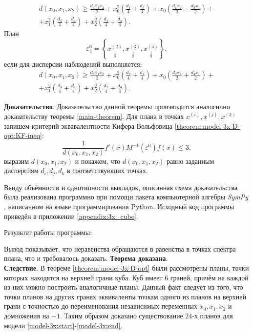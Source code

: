\begin{theorem}
	\begin{multline}\label{theorem:model-3x-D-opt:plan-3-d}
	d(x_0, x_1, x_2) \ge \frac{d_{4} x_{1} x_{2}}{2} + x_{0}^{2} \left(\frac{d_{1}}{4} + \frac{d_{3}}{4}\right) + x_{0} \left(\frac{d_{1} x_{2}}{2} - \frac{d_{3} x_{1}}{2}\right) + \\ + x_{1}^{2} \left(\frac{d_{3}}{4} + \frac{d_{4}}{4}\right) + x_{2}^{2} \left(\frac{d_{1}}{4} + \frac{d_{4}}{4}\right).
	\end{multline}
	План 
	\begin{equation} \label{theorem:model-3x-D-opt:plan-4}
	\varepsilon_4^{0} = \left \{ 
	\underset{\frac 1 3} {x^{(2)}},
	\underset{\frac 1 3} {x^{(3)}},
	\underset{\frac 1 3} {x^{(4)}}
	\right \},
	\end{equation}
	если для дисперсии наблюдений выполняется:
	\begin{multline}\label{theorem:model-3x-D-opt:plan-4-d}
	d(x_0, x_1, x_2) \ge \frac{d_{3} x_{1} x_{2}}{2} + x_{0}^{2} \left(\frac{d_{2}}{4} + \frac{d_{4}}{4}\right) + x_{0} \left(\frac{d_{2} x_{2}}{2} + \frac{d_{4} x_{1}}{2}\right) + \\ + x_{1}^{2} \left(\frac{d_{3}}{4} + \frac{d_{4}}{4}\right) + x_{2}^{2} \left(\frac{d_{2}}{4} + \frac{d_{3}}{4}\right).
	\end{multline}		
\end{theorem}

\textbf{Доказательство}. Доказательство данной теоремы производится аналогично доказательству теоремы \ref{main-theorem}. Для плана в точках $x^{(i)}, x^{(j)}, x^{(k)}$ запишем критерий эквавалентности Кифера-Вольфовица \eqref{theorem:model-3x-D-opt:KF-ineq}:
\begin{equation}\label{theorem:model-3x-D-opt:KF-ineq}
\frac{1}{d(x_0, x_1, x_2)} f'(x) M^{-1}(\varepsilon^0) f(x) \le 3,
\end{equation}
выразим $d(x_0, x_1, x_2)$ и покажем, что $d(x_0, x_1, x_2)$ равно заданным дисперсиям $d_i, d_j, d_k$ в соответствующих точках.

Ввиду объёмности и однотипности выкладок, описанная схема доказательства была реализована программно при помощи пакета компьютерной алгебры \textit{SymPy}  \cite{sympy}, написанном на языке программирования Python. Исходный код программы приведён в приложении \ref{appendix:3x_cube}.

Результат работы программы:

Вывод показывает, что неравенства обращаются в равенства в точках спектра плана, что и требовалось доказать. \textbf{Теорема доказана}.\\

\textbf{Следствие}.
В теореме \ref{theorem:model-3x-D-opt} были рассмотрены планы, точки которых находятся на верхней грани куба. Куб имеет 6 граней, причём на каждой из них можно построить аналогичные планы. Данный факт следует из того, что точки планов на других гранях эквиваленты точкам одного из планов на верхней грани с точностью до переименования независимых переменных $x_0, x_1, x_2$ и домножения на $-1$. Таким образом доказано существование $24$-х планов для модели \eqref{model-3x:start}-\eqref{model-3x:end}.	

